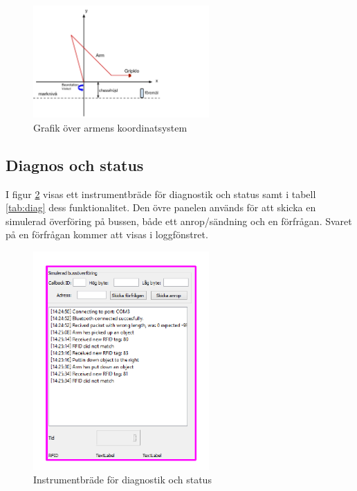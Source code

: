 \documentclass[a4paper,12pt]{article}
\begin{document}
\begin{figure}[H]
	\centering
	\includegraphics[width=0.6\textwidth]{arm_koord.pdf}
	\caption{Grafik över armens koordinatsystem}
	\label{fig:arm_koord}
\end{figure}

\subsection{Diagnos och status}
\label{subsec:diag}
I figur \ref{fig:pc_diag} visas ett instrumentbräde för diagnostik och status samt i tabell \ref{tab:diag} dess funktionalitet. Den övre panelen används för att skicka en simulerad överföring på bussen, både ett anrop/sändning och en förfrågan. Svaret på en förfrågan kommer att visas i loggfönstret.

\begin{figure}[H]
	\centering
	\includegraphics[width=0.6\textwidth]{diag.pdf}
	\caption{Instrumentbräde för diagnostik och status}
	\label{fig:pc_diag}
\end{figure}
\end{document}
